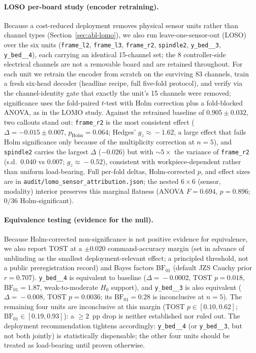 \documentclass[sensors,article,submit,moreauthors,pdftex]{Definitions/mdpi}
\begin{document}
\paragraph{LOSO per-board study (encoder retraining).} Because a cost-reduced deployment removes physical sensor units rather than channel types (Section~\ref{sec:abl-lomo}), we also run leave-one-sensor-out (LOSO) over the six units (\texttt{frame\_l2}, \texttt{frame\_l3}, \texttt{frame\_r2}, \texttt{spindle2}, \texttt{y\_bed\_\_3}, \texttt{y\_bed\_\_4}), each carrying an identical 15-channel set; the 8 controller-side electrical channels are not a removable board and are retained throughout. For each unit we retrain the encoder from scratch on the surviving 83 channels, train a fresh six-head decoder (headline recipe, full five-fold protocol), and verify via the channel-identity gate that exactly the unit's 15 channels were removed; significance uses the fold-paired $t$-test with Holm correction plus a fold-blocked ANOVA, as in the LOMO study. Against the retrained baseline of $0.905 \pm 0.032$, two callouts stand out: \texttt{frame\_r2} is the most consistent effect ($\Delta = -0.015 \pm 0.007$, $p_{\text{Holm}} = 0.064$; Hedges' $g_{z}\!\approx\!-1.62$, a large effect that fails Holm significance only because of the multiplicity correction at $n\!=\!5$), and \texttt{spindle2} carries the largest $\Delta$ ($-0.026$) but with ${\sim}5\times$ the variance of \texttt{frame\_r2} (s.d.\ $0.040$ vs $0.007$; $g_{z}\!\approx\!-0.52$), consistent with workpiece-dependent rather than uniform load-bearing. Full per-fold deltas, Holm-corrected $p$, and effect sizes are in \texttt{audit/lomo\_sensor\_attribution.json}; the nested $6\!\times\!6$ (sensor, modality) interior preserves this marginal flatness (ANOVA $F\!=\!0.694$, $p\!=\!0.896$; $0/36$ Holm-significant).

\paragraph{Equivalence testing (evidence for the null).} Because Holm-corrected non-significance is not positive evidence for equivalence, we also report TOST at a $\pm 0.020$ command-accuracy margin (set in advance of unblinding as the smallest deployment-relevant effect; a principled threshold, not a public preregistration record) and Bayes factors $\mathrm{BF}_{01}$ (default JZS Cauchy prior $r\!=\!0.707$). \texttt{y\_bed\_\_4} is equivalent to baseline ($\Delta\!=\!-0.0002$, TOST $p\!=\!0.018$, $\mathrm{BF}_{01}\!=\!1.87$, weak-to-moderate $H_0$ support), and \texttt{y\_bed\_\_3} is also equivalent ($\Delta\!=\!-0.008$, TOST $p\!=\!0.0036$; its $\mathrm{BF}_{01}\!=\!0.28$ is inconclusive at $n\!=\!5$). The remaining four units are inconclusive at this margin (TOST $p\!\in\![0.10, 0.62]$; $\mathrm{BF}_{01}\!\in\![0.19, 0.93]$): a $\ge 2$~pp drop is neither established nor ruled out. The deployment recommendation tightens accordingly: \texttt{y\_bed\_\_4} (or \texttt{y\_bed\_\_3}, but not both jointly) is statistically dispensable; the other four units should be treated as load-bearing until proven otherwise.
\end{document}
